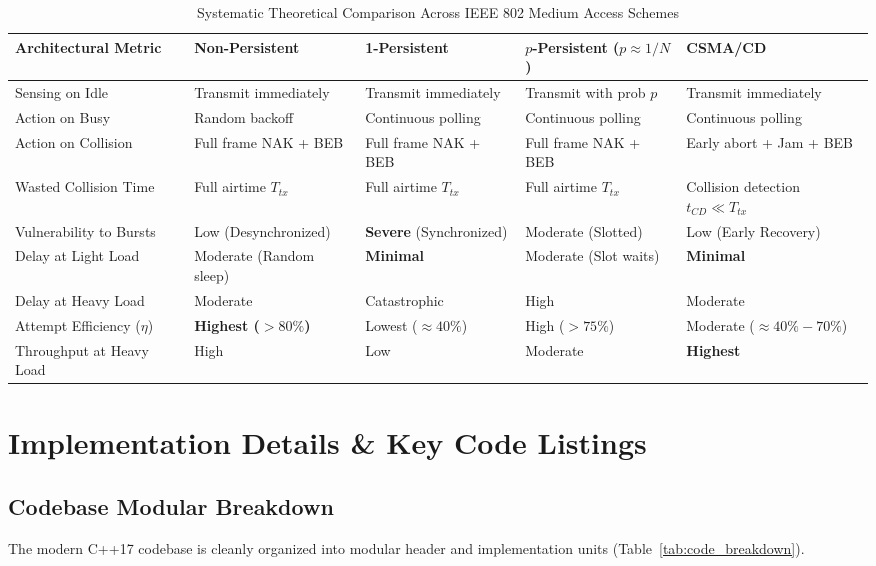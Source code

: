 \documentclass[11pt,a4paper]{article}
\begin{document}
\begin{table}[htbp]
\centering
\scriptsize
\renewcommand{\arraystretch}{1.2}
\begin{tabular}{p{3.2cm} >{\centering}p{2.6cm} >{\centering}p{2.6cm} >{\centering}p{2.6cm} >{\centering\arraybackslash}p{2.8cm}}
\rowcolor{tableheader}
\color{white}Architectural Metric & \color{white}Non-Persistent & \color{white}1-Persistent & \color{white}$p$-Persistent ($p \approx 1/N$) & \color{white}CSMA/CD \\
\hline
Sensing on Idle & Transmit immediately & Transmit immediately & Transmit with prob $p$ & Transmit immediately \\
Action on Busy & Random backoff & Continuous polling & Continuous polling & Continuous polling \\
Action on Collision & Full frame NAK + BEB & Full frame NAK + BEB & Full frame NAK + BEB & Early abort + Jam + BEB \\
Wasted Collision Time & Full airtime $T_{tx}$ & Full airtime $T_{tx}$ & Full airtime $T_{tx}$ & Collision detection $t_{CD} \ll T_{tx}$ \\
Vulnerability to Bursts & Low (Desynchronized) & \textbf{Severe} (Synchronized) & Moderate (Slotted) & Low (Early Recovery) \\
Delay at Light Load & Moderate (Random sleep) & \textbf{Minimal} & Moderate (Slot waits) & \textbf{Minimal} \\
Delay at Heavy Load & Moderate & Catastrophic & High & Moderate \\
Attempt Efficiency ($\eta$) & \textbf{Highest ($>80\%$)} & Lowest ($\approx 40\%$) & High ($>75\%$) & Moderate ($\approx 40\%-70\%$) \\
Throughput at Heavy Load & High & Low & Moderate & \textbf{Highest} \\
\bottomrule
\end{tabular}
\caption{Systematic Theoretical Comparison Across IEEE 802 Medium Access Schemes}
\label{tab:macro_comparison}
\end{table}

\section{Implementation Details \& Key Code Listings}

\subsection{Codebase Modular Breakdown}
The modern C++17 codebase is cleanly organized into modular header and implementation units (Table~\ref{tab:code_breakdown}).
\end{document}
